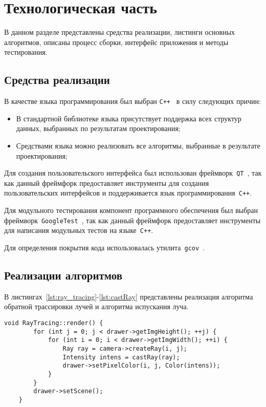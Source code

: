 \chapter{Технологическая часть}

В данном разделе представлены средства реализации, листинги основных алгоритмов, описаны процесс сборки, интерфейс приложения и методы тестирования.

\section{Средства реализации}
В качестве языка программирования был выбран \texttt{C++}~\cite{cpp} в силу следующих причин:
\begin{itemize}
	\item В стандартной библиотеке языка присутствует поддержка всех структур данных, выбранных по результатам проектирования;
	\item Средствами языка можно реализовать все алгоритмы, выбранные в результате проектирования;
\end{itemize}

Для создания пользовательского интерфейса был использован фреймворк~\texttt{QT}~\cite{qt}, так как данный фреймфорк предоставляет инструменты для создания пользовательских интерфейсов и поддерживается язык программирования~\texttt{C++}.


Для модульного тестирования компонент программного обеспечения был выбран фреймворк~\texttt{GoogleTest}~\cite{gtest}, так как данный фреймфорк предоставляет инструменты для написания модульных тестов на языке~\texttt{C++}.

Для определения покрытия кода использовалась утилита~\texttt{gcov}~\cite{gcov}.

\clearpage
\section{Реализации алгоритмов}
В листингах~\ref{lst:ray_tracing}-\ref{lst:castRay} представлены реализация алгоритма обратной трассировки лучей и алгоритма испускания луча.

\begin{center}
	\captionsetup{justification=raggedright,singlelinecheck=off}
	\renewcommand{\lstlistingname}{Листинг}
	\begin{lstlisting}[label=lst:ray_tracing, caption=Реализация алгоритма обратной трассировки лучей]
	void RayTracing::render() {
		for (int j = 0; j < drawer->getImgHeight(); ++j) {
			for (int i = 0; i < drawer->getImgWidth(); ++i) {
				Ray ray = camera->createRay(i, j);
				Intensity intens = castRay(ray);
				drawer->setPixelColor(i, j, Color(intens));
			}
		}
		drawer->setScene();
	}
	\end{lstlisting}
\end{center}

